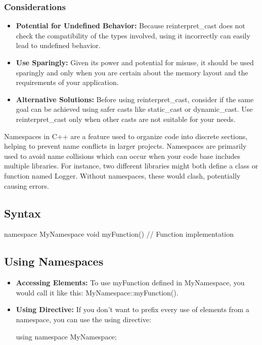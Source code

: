 \documentclass{report}
\begin{document}
    \bigbreak \noindent 
    \subsubsection{Considerations}
    \begin{itemize}
        \item \textbf{Potential for Undefined Behavior:} Because reinterpret\_cast does not check the compatibility of the types involved, using it incorrectly can easily lead to undefined behavior.
        \item \textbf{Use Sparingly:} Given its power and potential for misuse, it should be used sparingly and only when you are certain about the memory layout and the requirements of your application.
        \item \textbf{Alternative Solutions:} Before using reinterpret\_cast, consider if the same goal can be achieved using safer casts like static\_cast or dynamic\_cast. Use reinterpret\_cast only when other casts are not suitable for your needs.
    \end{itemize}

    \pagebreak 
    \bigbreak \noindent 
    \begin{concept}
        Namespaces in C++ are a feature used to organize code into discrete sections, helping to prevent name conflicts in larger projects. 
        \bigbreak \noindent 
        Namespaces are primarily used to avoid name collisions which can occur when your code base includes multiple libraries. For instance, two different libraries might both define a class or function named Logger. Without namespaces, these would clash, potentially causing errors.
    \end{concept}

    \bigbreak \noindent 
    \subsection{Syntax}
    \bigbreak \noindent 
    \begin{cppcode}
    namespace MyNamespace {
        void myFunction() {
            // Function implementation
        }
    }
    \end{cppcode}

    \bigbreak \noindent 
    \subsection{Using Namespaces}
    \bigbreak \noindent 
    \begin{itemize}
        \item \textbf{Accessing Elements:} To use myFunction defined in MyNamespace, you would call it like this: MyNamespace::myFunction().
        \item \textbf{Using Directive:} If you don't want to prefix every use of elements from a namespace, you can use the using directive:
            \bigbreak \noindent 
            \begin{cppcode}
            using namespace MyNamespace;
            \end{cppcode}
    \end{itemize}
\end{document}

